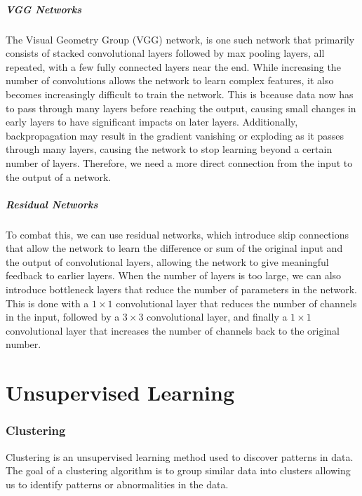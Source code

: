 \documentclass{article}
\begin{document}
\subsubsection{VGG Networks}
The Visual Geometry Group (VGG) network, is one such network that
primarily consists of stacked convolutional layers followed by max
pooling layers, all repeated, with a few fully connected layers near
the end. While increasing the number of convolutions allows the network
to learn complex features, it also becomes increasingly difficult to
train the network. This is bceause data now has to pass through many
layers before reaching the output, causing small changes in early
layers to have significant impacts on later layers. Additionally,
backpropagation may result in the gradient vanishing or exploding as it
passes through many layers, causing the network to stop learning beyond
a certain number of layers. Therefore, we need a more direct connection
from the input to the output of a network.
\subsubsection{Residual Networks}
To combat this, we can use residual networks, which introduce skip
connections that allow the network to learn the difference or sum of
the original input and the output of convolutional layers, allowing the
network to give meaningful feedback to earlier layers. When the number
of layers is too large, we can also introduce bottleneck layers that
reduce the number of parameters in the network. This is done with a \(1
\times 1\) convolutional layer that reduces the number of channels in
the input, followed by a \(3 \times 3\) convolutional layer, and
finally a \(1 \times 1\) convolutional layer that increases the number
of channels back to the original number.
\part{Unsupervised Learning}
\section{Clustering}
Clustering is an unsupervised learning method used to discover patterns
in data. The goal of a clustering algorithm is to group similar data
into clusters allowing us to identify patterns or abnormalities in the
data.
\end{document}
